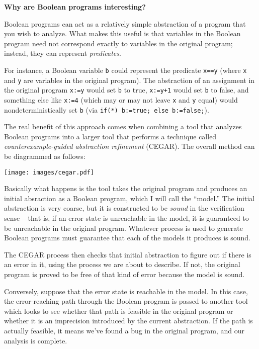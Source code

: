 \documentclass{article}
\newcommand{\Code}[1]{\texttt{#1}}
\newenvironment{sidebar}{}{}
\newcommand{\strong}[1]{\textbf{#1}}
\begin{document}
\begin{sidebar}
\strong{Why are Boolean programs interesting?}

Boolean programs can act as a relatively simple abstraction of a
program that you wish to analyze. What makes this useful is that
variables in the Boolean program need not correspond exactly to
variables in the original program; instead, they can represent
\emph{predicates}.

For instance, a Boolean variable \Code{b} could represent the
predicate \Code{x==y} (where \Code{x} and \Code{y} are variables in
the original program). The abstraction of an assignment in the
original program \Code{x:=y} would set \Code{b} to true, \Code{x:=y+1}
would set \Code{b} to false, and something else like \Code{x:=4}
(which may or may not leave \Code{x} and \Code{y} equal) would
nondeterministically set \Code{b} (via \Code{if(*) b:=true; else
  b:=false;}). 

The real benefit of this approach comes when combining a tool that
analyzes Boolean programs into a larger tool that performs a technique
called \emph{counterexample-guided abstraction refinement}
(CEGAR). The overall method can be diagrammed as follows:
\begin{center}
  \texttt{[image: images/cegar.pdf]}
\end{center}

Basically what happens is the tool takes the original program and
produces an initial absraction as a Boolean program, which I will call
the ``model.'' The initial abstraction is very coarse, but it is
constructed to be \emph{sound} in the verification sense -- that is,
if an error state is unreachable in the model, it is guaranteed to be
unreachable in the original program. Whatever process is used to
generate Boolean programs must guarantee that each of the models it
produces is sound.

The CEGAR process then checks that initial abstraction to figure out
if there is an error in it, using the process we are about to
describe. If not, the original program is proved to be free of that
kind of error because the model is sound.

Conversely, suppose that the error state is reachable in the model. In
this case, the error-reaching path through the Boolean program is
passed to another tool which looks to see whether that path is
feasible in the original program or whether it is an imprecision
introduced by the current abstraction. If the path is actually
feasible, it means we've found a bug in the original program, and our
analysis is complete.


\end{sidebar}
\end{document}
